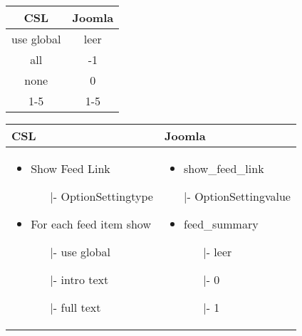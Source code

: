\begin{minipage}{0.4\textwidth}
\begin{tabular}{|c|c|}
\hline
\textbf{CSL} & \textbf{Joomla} \\ 
\hline
use global & leer \\ 
\hline
all & -1 \\ 
\hline
none & 0 \\ 
\hline
1-5 & 1-5 \\
\hline
\end{tabular}
\end{minipage}
\begin{minipage}{0.6\textwidth}
\begin{tabular}{|p{} | p{}|}
\hline
\textbf{CSL} & \textbf{Joomla} \\ 
\hline
\begin{itemize}
	\item Show Feed Link
	\begin{enumerate}
		\item[|-]OptionSettingtype
	\end{enumerate}
	\item For each feed item show
	\begin{enumerate}
	 \item[|-] use global
	 \item[|-] intro text
	 \item[|-] full text
	\end{enumerate}
\end{itemize}
 & 
\begin{itemize}
	\item show\_feed\_link
	 \item[|-]OptionSettingvalue
	\item feed\_summary
	\begin{enumerate}
		 \item[|-]leer
		 \item[|-]0
		 \item[|-]1
		\end{enumerate}
	
\end{itemize}
\\
\hline
\end{tabular}
\end{minipage}

